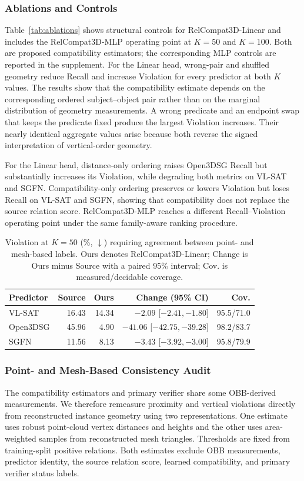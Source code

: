 \documentclass[letterpaper]{article}
\begin{document}
\subsubsection{Ablations and Controls}
Table~\ref{tab:ablations} shows structural controls for RelCompat3D-Linear and includes the RelCompat3D-MLP operating point at $K=50$ and $K=100$. Both are proposed compatibility estimators; the corresponding MLP controls are reported in the supplement. For the Linear head, wrong-pair and shuffled geometry reduce Recall and increase Violation for every predictor at both $K$ values. The results show that the compatibility estimate depends on the corresponding ordered subject--object pair rather than on the marginal distribution of geometry measurements. A wrong predicate and an endpoint swap that keeps the predicate fixed produce the largest Violation increases. Their nearly identical aggregate values arise because both reverse the signed interpretation of vertical-order geometry.

For the Linear head, distance-only ordering raises Open3DSG Recall but substantially increases its Violation, while degrading both metrics on VL-SAT and SGFN. Compatibility-only ordering preserves or lowers Violation but loses Recall on VL-SAT and SGFN, showing that compatibility does not replace the source relation score. RelCompat3D-MLP reaches a different Recall--Violation operating point under the same family-aware ranking procedure.

\begin{table}[t]
\centering
{\small
\setlength{\tabcolsep}{1.5pt}
\begin{tabular}{@{}lrrrr@{}}
\toprule
Predictor & Source & Ours & Change (95\% CI) & Cov. \\
\midrule
VL-SAT   & 16.43 & 14.34 & $-2.09$ [$-2.41,-1.80$] & 95.5/71.0 \\
Open3DSG & 45.96 & 4.90  & $-41.06$ [$-42.75,-39.28$] & 98.2/83.7 \\
SGFN     & 11.56 & 8.13  & $-3.43$ [$-3.92,-3.00$] & 95.8/79.9 \\
\bottomrule
\end{tabular}
}
\caption{Violation at $K=50$ (\%, $\downarrow$) requiring agreement
between point- and mesh-based labels. Ours denotes RelCompat3D-Linear; Change is Ours minus Source with a paired 95\% interval; Cov. is measured/decidable coverage.}
\label{tab:surface-audit}
\end{table}

\subsubsection{Point- and Mesh-Based Consistency Audit}
The compatibility estimators and primary verifier share some OBB-derived measurements. We therefore remeasure proximity and vertical violations directly from reconstructed instance geometry using two representations. One estimate uses robust point-cloud vertex distances and heights and the other uses area-weighted samples from reconstructed mesh triangles. Thresholds are fixed from training-split positive relations. Both estimates exclude OBB measurements, predictor identity, the source relation score, learned compatibility, and primary verifier status labels.
\end{document}
